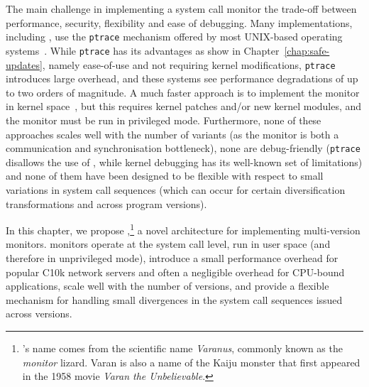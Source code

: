 
The main challenge in implementing a system call monitor the trade-off between
performance, security, flexibility and ease of debugging.  Many
implementations, including \mx, use the \lstinline`ptrace` mechanism offered by
most UNIX-based operating systems~\cite{orchestra09,mx,process-replicae07}.
While \lstinline`ptrace` has its advantages as show in
Chapter~\ref{chap:safe-updates}, namely ease-of-use and not requiring kernel
modifications, \lstinline`ptrace` introduces large overhead, and these systems
see performance degradations of up to two orders of magnitude.  A much faster
approach is to implement the monitor in kernel space~\cite{cox2006}, but this
requires kernel patches and/or new kernel modules, and the monitor must be run
in privileged mode.  Furthermore, none of these approaches scales well with the
number of variants (as the monitor is both a communication and synchronisation
bottleneck), none are debug-friendly (\lstinline`ptrace` disallows the use of
\gdb, while kernel debugging has its well-known set of limitations) and none of
them have been designed to be flexible with respect to small variations in
system call sequences (which can occur for certain diversification
transformations and across program versions).

In this chapter, we propose \varan,\footnote{\varan's name comes from
  the scientific name \emph{Varanus}, commonly known as the
  \emph{monitor} lizard. Varan is also a name of the Kaiju monster
  that first appeared in the 1958 movie \emph{Varan the
    Unbelievable}.} a novel architecture for implementing multi-version
monitors.  \varan monitors operate at the system call level, run in
user space (and therefore in unprivileged mode), introduce a small
performance overhead for popular C10k network servers and often a
negligible overhead for CPU-bound applications, scale well with the
number of versions, and provide a flexible mechanism for handling small
divergences in the system call sequences issued across versions.







